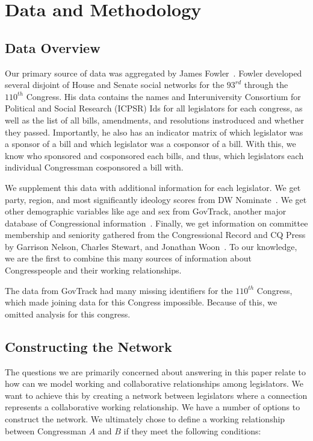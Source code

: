 \section{Data and Methodology}

\subsection{Data Overview}

Our primary source of data was aggregated by James Fowler~\cite{Fowler}. Fowler
developed several disjoint of House and Senate social networks for the $93^{rd}$
through the $110^{th}$ Congress. His data contains the names and Interuniversity
Consortium for Political and Social Research (ICPSR) Ids for all legislators for
each congress, as well as the list of all bills, amendments, and resolutions
instroduced and whether they passed. Importantly, he also has an indicator
matrix of which legislator was a sponsor of a bill and which legislator was a
cosponsor of a bill. With this, we know who sponsored and cosponsored each
bills, and thus,  which legislators each individual Congressman cosponsored a
bill with.

We supplement this data with additional information for each legislator. We get
party, region, and most significantly ideology scores from DW Nominate~\cite{DW-
NOMINATE}. We get other demographic variables like age and sex from GovTrack,
another major database of Congressional information~\cite{GovTrack}. Finally, we
get information on committee membership and seniority gathered from the
Congressional Record and CQ Press by Garrison Nelson, Charles Stewart, and
Jonathan Woon~\cite{Nelson, Stewart}. To our knowledge, we are the first to
combine this many sources of information about Congresspeople and their working
relationships.

The data from GovTrack had many missing identifiers for the $110^{th}$ Congress,
which made joining data for this Congress impossible. Because of this, we
omitted analysis for this congress.

\subsection{Constructing the Network}

The questions we are primarily concerned about answering in this paper relate 
to how can we model working and collaborative relationships among legislators. 
We want to achieve this by creating a network between legislators where a 
connection represents a collaborative working relationship. We have a number of 
options to construct the network. We ultimately chose to define a working 
relationship between Congressman $A$ and $B$ if they meet the following 
conditions:

